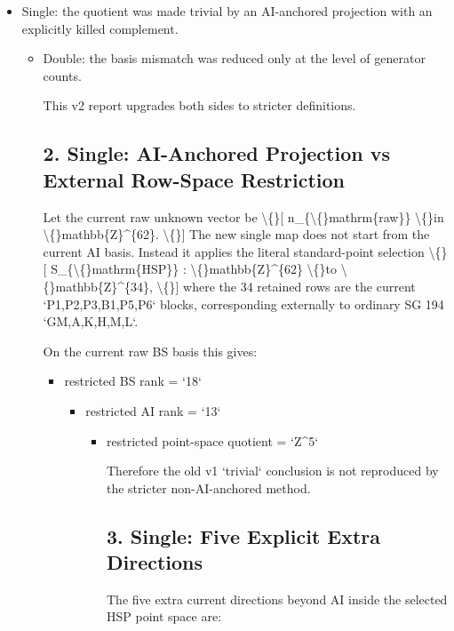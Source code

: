 \documentclass[11pt]{article}
\begin{document}
\begin{itemize}
\item Single: the quotient was made trivial by an AI-anchored projection with an explicitly killed complement.
\begin{itemize}
\item Double: the basis mismatch was reduced only at the level of generator counts.

        This v2 report upgrades both sides to stricter definitions.

\subsection*{2. Single: AI-Anchored Projection vs External Row-Space Restriction}

        Let the current raw unknown vector be
        \textbackslash\{\}[
        n\_\{\textbackslash\{\}mathrm\{raw\}\} \textbackslash\{\}in \textbackslash\{\}mathbb\{Z\}\textasciicircum{}\{62\}.
        \textbackslash\{\}]
        The new single map does not start from the current AI basis. Instead it applies the literal standard-point selection
        \textbackslash\{\}[
        S\_\{\textbackslash\{\}mathrm\{HSP\}\} : \textbackslash\{\}mathbb\{Z\}\textasciicircum{}\{62\} \textbackslash\{\}to \textbackslash\{\}mathbb\{Z\}\textasciicircum{}\{34\},
        \textbackslash\{\}]
        where the 34 retained rows are the current `P1,P2,P3,B1,P5,P6` blocks, corresponding externally to ordinary SG 194 `GM,A,K,H,M,L`.

        On the current raw BS basis this gives:

\begin{itemize}
\item restricted BS rank = `18`
\begin{itemize}
\item restricted AI rank = `13`
\begin{itemize}
\item restricted point-space quotient = `Z\textasciicircum{}5`

        Therefore the old v1 `trivial` conclusion is not reproduced by the stricter non-AI-anchored method.

\subsection*{3. Single: Five Explicit Extra Directions}

        The five extra current directions beyond AI inside the selected HSP point space are:


\end{itemize}
\end{itemize}
\end{itemize}
\end{itemize}
\end{itemize}
\end{document}
